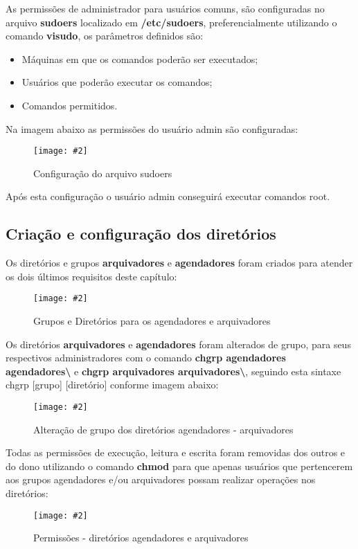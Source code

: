 \documentclass[
	12pt,				%
	openany,			%
	a4paper,			%
	chapter=TITLE,		%
	section=TITLE,		%
	english,
	brazil				%
]{abntex2}
\newcommand{\colcheted}{] }
\newcommand{\colchetee}{[}
\newcommand{\includeImage}[3] {

\begin{figure}[H]
 	 \centering
  		\texttt{[image: \#2]}
  	\caption{#3}
\end{figure}

}
\begin{document}
As permissões de administrador para usuários comuns, são configuradas no arquivo \textbf{sudoers} localizado em \textbf{/etc/sudoers}, preferencialmente utilizando o comando \textbf{visudo}, os parâmetros definidos são:

\begin{itemize}
	\item Máquinas em que os comandos poderão ser executados;
	\item Usuários que poderão executar os comandos;
	\item Comandos permitidos.
\end{itemize}

Na imagem abaixo as permissões do usuário admin são configuradas:

\includeImage{0.7}{imgs/5_gerenciamento_grupos/adicionando_permissoes_de_root_para_usuario_admin.png}{Configuração do arquivo sudoers}

Após esta configuração o usuário admin conseguirá executar comandos root.

\subsection{Criação e configuração dos diretórios}

Os diretórios e grupos \textbf{arquivadores} e \textbf{agendadores} foram criados para atender os dois últimos requisitos deste capítulo:

\includeImage{0.7}{imgs/5_gerenciamento_grupos/diretorios_grupos_arquivadores_agendadores.png}{Grupos e Diretórios para os agendadores e arquivadores}

Os diretórios \textbf{arquivadores} e \textbf{agendadores} foram alterados de grupo, para seus respectivos administradores com o comando \textbf{chgrp agendadores agendadores\textbackslash} e \textbf{chgrp arquivadores arquivadores\textbackslash}, seguindo esta sintaxe chgrp \colchetee grupo\colcheted \colchetee diretório\colcheted conforme imagem abaixo:

\includeImage{0.7}{imgs/5_gerenciamento_grupos/alteracao_de_grupo_dos_diretorios.png}{Alteração de grupo dos diretórios agendadores - arquivadores}

Todas as permissões de execução, leitura e escrita foram removidas dos outros e do dono utilizando o comando \textbf{chmod} para que apenas usuários que pertencerem aos grupos agendadores e/ou arquivadores possam realizar operações nos diretórios:

\includeImage{0.7}{imgs/5_gerenciamento_grupos/permissao_restringida_apenas_para_os_grupos.png}{Permissões - diretórios agendadores e arquivadores}
\end{document}
